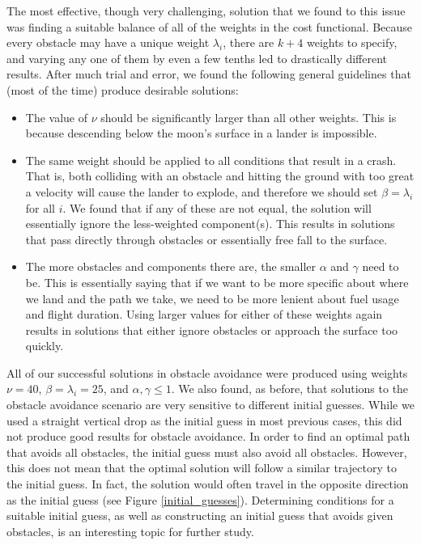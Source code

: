 \documentclass{article}
\begin{document}
The most effective, though very challenging, solution that we found to this issue was finding a suitable balance of all of the weights in the cost functional. Because every obstacle may have a unique weight $\lambda_i$, there are $k+4$ weights to specify, and varying any one of them by even a few tenths led to drastically different results. After much trial and error, we found the following general guidelines that (most of the time) produce desirable solutions:
\begin{itemize}
    \item The value of $\nu$ should be significantly larger than all other weights. This is because descending below the moon's surface in a lander is impossible.
    \item The same weight should be applied to all conditions that result in a crash. That is, both colliding with an obstacle and hitting the ground with too great a velocity will cause the lander to explode, and therefore we should set $\beta = \lambda_i$ for all $i$. We found that if any of these are not equal, the solution will essentially ignore the less-weighted component(s). This results in solutions that pass directly through obstacles or essentially free fall to the surface.
    \item The more obstacles and components there are, the smaller $\alpha$ and $\gamma$ need to be. This is essentially saying that if we want to be more specific about where we land and the path we take, we need to be more lenient about fuel usage and flight duration. Using larger values for either of these weights again results in solutions that either ignore obstacles or approach the surface too quickly.
\end{itemize}
All of our successful solutions in obstacle avoidance were produced using weights $\nu = 40$, $\beta = \lambda_i = 25$, and $\alpha, \gamma \leq 1$. 
We also found, as before, that solutions to the obstacle avoidance scenario are very sensitive to different initial guesses. While we used a straight vertical drop as the initial guess in most previous cases, this did not produce good results for obstacle avoidance. In order to find an optimal path that avoids all obstacles, the initial guess must also avoid all obstacles. However, this does not mean that the optimal solution will follow a similar trajectory to the initial guess. In fact, the solution would often travel in the opposite direction as the initial guess (see Figure \ref{initial_guesses}). Determining conditions for a suitable initial guess, as well as constructing an initial guess that avoids given obstacles, is an interesting topic for further study.
\end{document}
